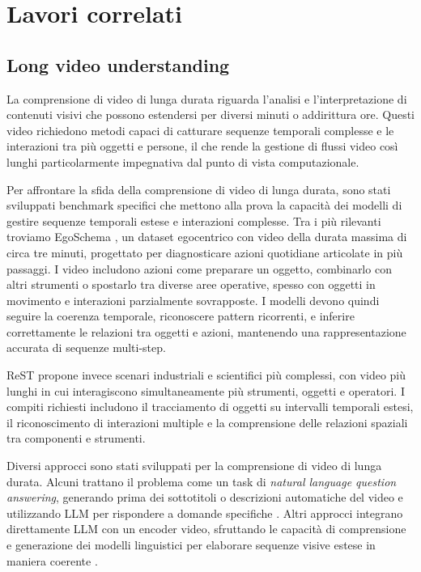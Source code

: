 \chapter{Lavori correlati}
\section{Long video understanding}
La comprensione di video di lunga durata riguarda l'analisi e l'interpretazione di contenuti visivi che possono estendersi per diversi minuti o addirittura ore. Questi video richiedono metodi capaci di catturare sequenze temporali complesse e le interazioni tra più oggetti e persone, il che rende la gestione di flussi video così lunghi particolarmente impegnativa dal punto di vista computazionale.

Per affrontare la sfida della comprensione di video di lunga durata, sono stati sviluppati benchmark specifici che mettono alla prova la capacità dei modelli di gestire sequenze temporali estese e interazioni complesse. Tra i più rilevanti troviamo EgoSchema \cite{mangalam2023egoschemadiagnosticbenchmarklongform}, un dataset egocentrico con video della durata massima di circa tre minuti, progettato per diagnosticare azioni quotidiane articolate in più passaggi. I video includono azioni come preparare un oggetto, combinarlo con altri strumenti o spostarlo tra diverse aree operative, spesso con oggetti in movimento e interazioni parzialmente sovrapposte. I modelli devono quindi seguire la coerenza temporale, riconoscere pattern ricorrenti, e inferire correttamente le relazioni tra oggetti e azioni, mantenendo una rappresentazione accurata di sequenze multi-step.

ReST \cite{Yang_2023_CVPR} propone invece scenari industriali e scientifici più complessi, con video più lunghi in cui interagiscono simultaneamente più strumenti, oggetti e operatori. I compiti richiesti includono il tracciamento di oggetti su intervalli temporali estesi, il riconoscimento di interazioni multiple e la comprensione delle relazioni spaziali tra componenti e strumenti. 

Diversi approcci sono stati sviluppati per la comprensione di video di lunga durata. Alcuni trattano il problema come un task di \emph{natural language question answering}, generando prima dei sottotitoli o descrizioni automatiche del video e utilizzando LLM per rispondere a domande specifiche \cite{ma2024drvideodocumentretrievalbased, park2025framesusefulefficientstrategies, wang2024videoagentlongformvideounderstanding, wang2024lifelongmemoryleveragingllmsanswering, wang2025videotreeadaptivetreebasedvideo, wu2022memvitmemoryaugmentedmultiscalevision}. Altri approcci integrano direttamente LLM con un encoder video, sfruttando le capacità di comprensione e generazione dei modelli linguistici per elaborare sequenze visive estese in maniera coerente \cite{li2024llmsmeetlongvideo, qian2024streaminglongvideounderstanding, ren2024timechattimesensitivemultimodallarge, song2024moviechatdensetokensparse}.

